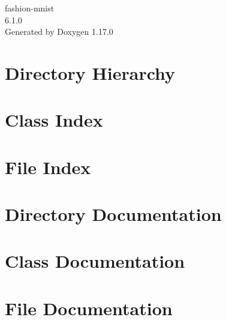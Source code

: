 \documentclass[twoside]{book}
\newcommand{\+}{\discretionary{\mbox{\scriptsize$\hookleftarrow$}}{}{}}
\newcommand{\clearemptydoublepage}{%
    \newpage{\pagestyle{empty}\cleardoublepage}%
  }
\begin{document}
  \raggedbottom
    \hypersetup{pageanchor=false,
                bookmarksnumbered=true,
                pdfencoding=unicode
               }
  \begin{titlepage}
  \vspace*{7cm}
  \begin{center}%
  {\Large fashion-\/mnist}\\
  [1ex]\large 6.\+1.\+0 \\
  \vspace*{1cm}
  {\large Generated by Doxygen 1.17.0}\\
  \end{center}
  \end{titlepage}
  \clearemptydoublepage
  \tableofcontents
  \clearemptydoublepage
  \hypersetup{pageanchor=true}
\chapter{Directory Hierarchy}

\chapter{Class Index}

\chapter{File Index}

\chapter{Directory Documentation}

\chapter{Class Documentation}


\chapter{File Documentation}








  \backmatter
  \newpage
  \clearemptydoublepage
  \printindex
\end{document}

